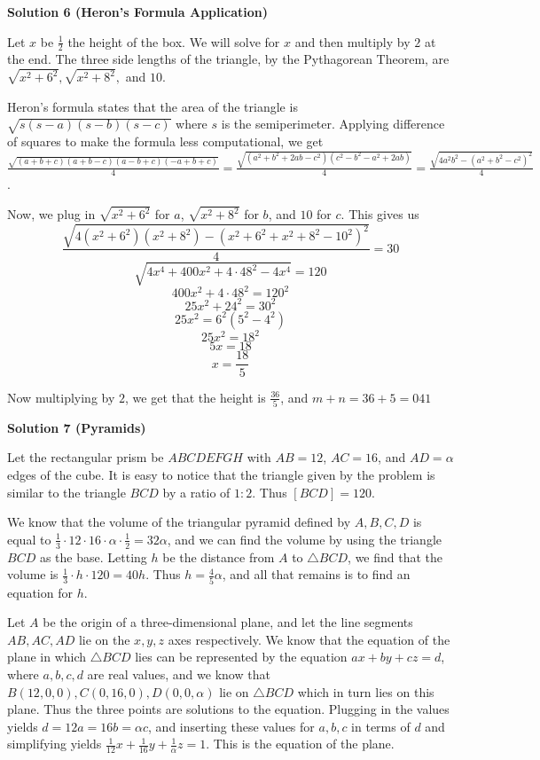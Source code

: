 \begin{enumerate}
\textbf{Solution 6 (Heron's Formula Application)}

Let $x$ be $\frac12$ the height of the box. We will solve for $x$ and then multiply by $2$ at the end. The three side lengths of the triangle, by the Pythagorean Theorem, are $\sqrt{x^2+6^2},\sqrt{x^2+8^2},$ and $10$.

 Heron's formula states that the area of the triangle is $\sqrt{s(s-a)(s-b)(s-c)}$ where $s$ is the semiperimeter. Applying difference of squares to make the formula less computational, we get $\frac{\sqrt{(a+b+c)(a+b-c)(a-b+c)(-a+b+c)}}{4}=\frac{\sqrt{(a^2+b^2+2ab-c^2)(c^2-b^2-a^2+2ab)}}4=\frac{\sqrt{4a^2b^2-(a^2+b^2-c^2)^2}}4$.

 Now, we plug in $\sqrt{x^2+6^2}$ for $a$, $\sqrt{x^2+8^2}$ for $b$, and $10$ for $c$. This gives us 
 \[\frac{\sqrt{4(x^2+6^2)(x^2+8^2)-(x^2+6^2+x^2+8^2-10^2)^2}}4=30\]
 \[\sqrt{4x^4+400x^2+4\cdot48^2-4x^4}=120\]
 \[400x^2+4\cdot48^2=120^2\]
 \[25x^2+24^2=30^2\]
 \[25x^2=6^2(5^2-4^2)\]
 \[25x^2=18^2\]
 \[5x=18\]
 \[x=\frac{18}5\]

 Now multiplying by $2$, we get that the height is $\frac{36}5$, and $m+n=36+5=\boxed{041}$




\textbf{Solution 7 (Pyramids)}

Let the rectangular prism be $ABCDEFGH$ with $AB=12$, $AC=16$, and $AD=\alpha$ edges of the cube. It is easy to notice that the triangle given by the problem is similar to the triangle $BCD$ by a ratio of $1:2$. Thus $[BCD]=120$.

 We know that the volume of the triangular pyramid defined by $A,B,C,D$ is equal to $\frac{1}{3}\cdot12\cdot16\cdot\alpha\cdot\frac{1}{2}=32\alpha$, and we can find the volume by using the triangle $BCD$ as the base. Letting $h$ be the distance from $A$ to $\triangle BCD$, we find that the volume is $\frac{1}{3}\cdot h\cdot120=40h$. Thus $h=\frac{4}{5}\alpha$, and all that remains is to find an equation for $h$.

 Let $A$ be the origin of a three-dimensional plane, and let the line segments $AB,AC,AD$ lie on the $x,y,z$ axes respectively. We know that the equation of the plane in which $\triangle BCD$ lies can be represented by the equation $ax+by+cz=d$, where $a,b,c,d$ are real values, and we know that $B(12,0,0),C(0,16,0),D(0,0,\alpha)$ lie on $\triangle BCD$ which in turn lies on this plane. Thus the three points are solutions to the equation. Plugging in the values yields $d=12a=16b=\alpha c$, and inserting these values for $a,b,c$ in terms of $d$ and simplifying yields $\frac{1}{12}x+\frac{1}{16}y+\frac{1}{\alpha}z=1$. This is the equation of the plane.


\end{enumerate}
